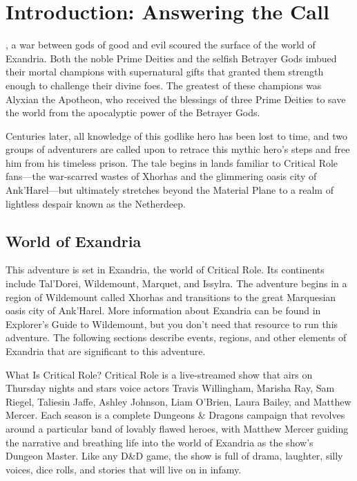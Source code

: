 \documentclass[10pt,a4paper,twoside,bg=print,twocolumn,openany,nodeprecatedcode]{dndbook}
\begin{document}
\frontmatter

\tableofcontents
\newpage
\mainmatter%


\chapter*{Introduction: Answering the Call}

, a war between gods of good and evil scoured the surface of the world of Exandria. Both the noble Prime Deities and the selfish Betrayer Gods imbued their mortal champions with supernatural gifts that granted them strength enough to challenge their divine foes. The greatest of these champions was Alyxian the Apotheon, who received the blessings of three Prime Deities to save the world from the apocalyptic power of the Betrayer Gods.

Centuries later, all knowledge of this godlike hero has been lost to time, and two groups of adventurers are called upon to retrace this mythic hero's steps and free him from his timeless prison. The tale begins in lands familiar to Critical Role fans—the war-scarred wastes of Xhorhas and the glimmering oasis city of Ank'Harel—but ultimately stretches beyond the Material Plane to a realm of lightless despair known as the Netherdeep.

\section{World of Exandria}
This adventure is set in Exandria, the world of Critical Role. Its continents include Tal'Dorei, Wildemount, Marquet, and Issylra. The adventure begins in a region of Wildemount called Xhorhas and transitions to the great Marquesian oasis city of Ank'Harel. More information about Exandria can be found in Explorer's Guide to Wildemount, but you don't need that resource to run this adventure.
The following sections describe events, regions, and other elements of Exandria that are significant to this adventure.

\begin{DndSidebar}[float=!b]{What Is Critical Role?}
Critical Role is a live-streamed show that airs on Thursday nights and stars voice actors Travis Willingham, Marisha Ray, Sam Riegel, Taliesin Jaffe, Ashley Johnson, Liam O'Brien, Laura Bailey, and Matthew Mercer. Each season is a complete Dungeons \& Dragons campaign that revolves around a particular band of lovably flawed heroes, with Matthew Mercer guiding the narrative and breathing life into the world of Exandria as the show's Dungeon Master. Like any D\&D game, the show is full of drama, laughter, silly voices, dice rolls, and stories that will live on in infamy.
\end{DndSidebar}
\end{document}

